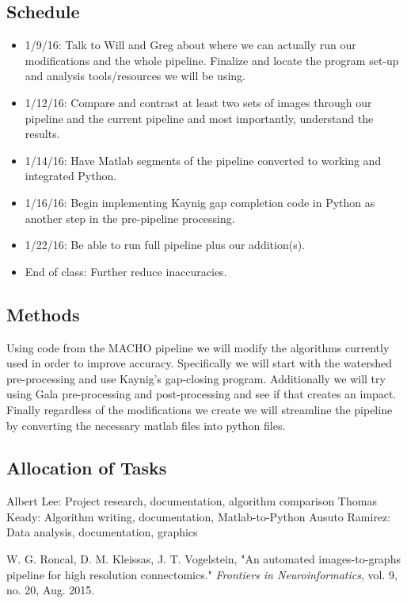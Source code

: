 \documentclass[11pt]{article}
\begin{document}
\subsection{Schedule}
\begin{itemize}
\item 1/9/16: Talk to Will and Greg about where we can actually run our modifications and the whole pipeline. Finalize and locate the program set-up and analysis tools/resources we will be using. \newline
\item 1/12/16: Compare and contrast at least two sets of images through our pipeline and the current pipeline and most importantly, understand the results. \newline
\item 1/14/16: Have Matlab segments of the pipeline converted to working and integrated Python. \newline
\item 1/16/16: Begin implementing Kaynig gap completion code in Python as another step in the pre-pipeline processing. \newline
\item 1/22/16: Be able to run full pipeline plus our addition(s). \newline
\item End of class: Further reduce inaccuracies. \newline
\end{itemize}

\subsection{Methods}

Using code from the MACHO pipeline we will modify the algorithms currently used in order to improve accuracy. Specifically we will start with the watershed pre-processing and use Kaynig's gap-closing program. Additionally we will try using Gala pre-processing and post-processing and see if that creates an impact. Finally regardless of the modifications we create we will streamline the pipeline by converting the necessary matlab files into python files.

\subsection{Allocation of Tasks}
Albert Lee: Project research, documentation, algorithm comparison \newline
Thomas Keady: Algorithm writing, documentation, Matlab-to-Python \newline
Ausuto Ramirez: Data analysis, documentation, graphics\newline

\newpage

\begin{thebibliography}{1}
 W. G. Roncal, D. M. Kleissas, J. T. Vogelstein, "An automated images-to-graphs pipeline for high resolution connectomics." \textit{Frontiers in Neuroinformatics}, vol. 9, no. 20, Aug. 2015.
\end{thebibliography}
\end{document}
